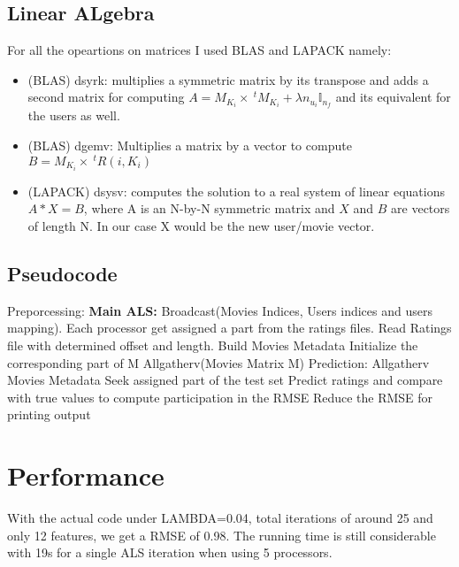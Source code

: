 \documentclass[10pt]{article}
\begin{document}
\subsection{Linear ALgebra}
For all the opeartions on matrices I used BLAS and LAPACK namely:
\begin{itemize}
\item (BLAS)  dsyrk: multiplies a symmetric matrix by its transpose and adds a second matrix for computing $A=M_{K_i}\times~^tM_{K_i}+\lambda n_{u_i}\mathbb I_{n_f}$ and its equivalent for the users as well.
\item (BLAS)  dgemv: Multiplies a matrix by a vector to compute $B=M_{K_i}\times ~^tR(i,K_i)$
\item (LAPACK) dsysv: computes the solution to a real system of linear equations $A * X = B$, where A is an N-by-N symmetric matrix and $X$ and $B$ are vectors of length N. In our case X would be the new user/movie vector.
\end{itemize}
\subsection{Pseudocode}
\begin{algorithm}[H]
\DontPrintSemicolon
{\large Preporcessing:}
{\large\bfseries Main ALS:}\;
	Broadcast(Movies Indices, Users indices and users mapping).\;
	Each processor get assigned a part from the ratings files.\;
	Read Ratings file with determined offset and length.\;
	Build Movies Metadata\;
	Initialize the corresponding part of M\;
	Allgatherv(Movies Matrix M)\;
{\large Prediction:}\;
	Allgatherv Movies Metadata 
	Seek assigned part of the test set\;
	Predict ratings and compare with true values to compute participation in the RMSE\;
	Reduce the RMSE for printing output\;
\end{algorithm}
\section{Performance}
With the actual code under LAMBDA=0.04, total iterations of around 25 and only 12 features, we get a RMSE of 0.98. The running time is still considerable with 19s for a single ALS iteration when using 5 processors.\\
\end{document}
